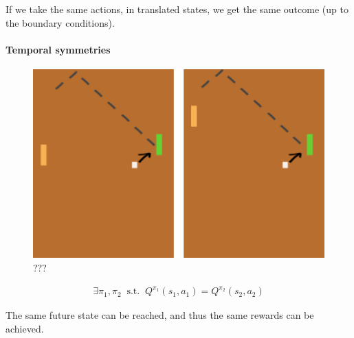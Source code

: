 If we take the same actions, in translated states, we get the same
outcome (up to the boundary conditions).

\hypertarget{temporal-symmetries}{%
\paragraph{Temporal symmetries}\label{temporal-symmetries}}

\begin{figure}
\centering
\includegraphics[width=1\textwidth,height=0.25\textheight]{../../pictures/drawings/pong-reach.png}
\caption{???}
\end{figure}

\begin{align}
\exists \pi_1, \pi_2 \;\;\text{s.t.} \;\; Q^{\pi_1}(s_1, a_1) = Q^{\pi_2}(s_2, a_2)
\end{align}

The same future state can be reached, and thus the same rewards can be
achieved.
